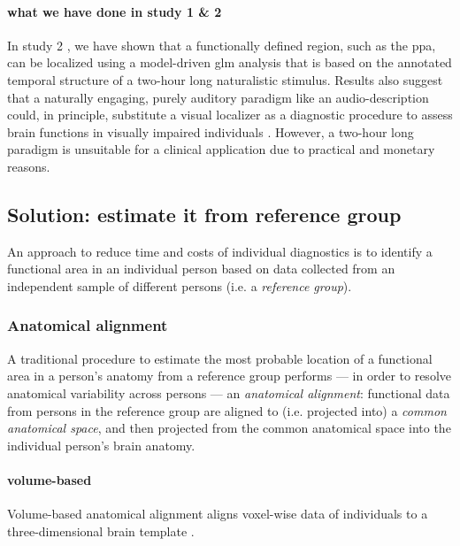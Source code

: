 \paragraph{what we have done in study 1 \& 2}

%
In study 2 \citep{haeusler2022processing}, we have shown that a functionally
defined region, such as the \ac{ppa}, can be localized using a model-driven
\ac{glm} analysis that is based on the annotated temporal structure of a
two-hour long naturalistic stimulus.
%
Results also suggest that a naturally engaging, purely auditory paradigm like an
audio-description could, in principle, substitute a visual localizer as a
diagnostic procedure to assess brain functions in visually impaired individuals
\citep{haeusler2022processing}.
%
However, a two-hour long paradigm is unsuitable for a clinical application due
to practical and monetary reasons.


\subsection{Solution: estimate it from reference group}

An approach to reduce time and costs of individual diagnostics is to identify a
functional area in an individual person based on data collected from an
independent sample of different persons (i.e. a \textit{reference group}).


\subsubsection{Anatomical alignment}

%
A traditional procedure \citep{frost2012measuring, weiner2018defining,
zhen2017quantifying, zhen2015quantifying, rosenke2021probabilistic,
wang2015probabilistic} to estimate the most probable location of a functional
area in a person's anatomy from a reference group performs --- in order to
resolve anatomical variability across persons --- an \textit{anatomical
alignment}:
%
functional data from persons in the reference group are aligned to (i.e.
projected into) a \textit{common anatomical space}, and then projected from the
common anatomical space into the individual person's brain anatomy.


\paragraph{volume-based}
Volume-based anatomical alignment \citep[s.][for a review]{klein2009evaluation}
aligns voxel-wise data of individuals to a three-dimensional brain template
\citep[e.g., MNI152 template;][]{fonov2011unbiased}.


